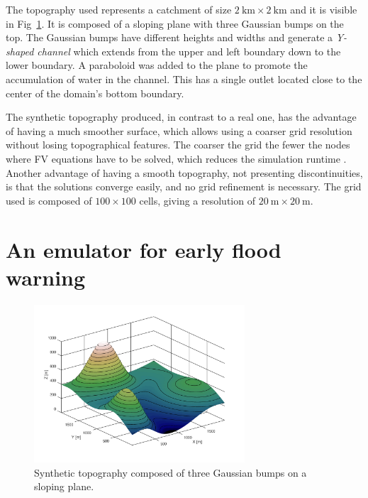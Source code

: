 The topography used represents a catchment of size $\SI{2}{\kilo\meter} \times \SI{2}{\kilo\meter}$ and it is visible in Fig~\ref{fig:topography}.
It is composed of a sloping plane with three Gaussian bumps on the top.
The Gaussian bumps have different heights and widths and generate a \emph{Y-shaped channel} which extends from the upper and left boundary down to the lower boundary.
A paraboloid was added to the plane to promote the accumulation of water in the channel.
This has a single outlet located close to the center of the domain's bottom boundary.

The synthetic topography produced, in contrast to a real one, has the advantage of having a much smoother surface, which allows using a coarser grid resolution without losing topographical features.
The coarser the grid the fewer the nodes where FV equations have to be solved, which reduces the simulation runtime . 
Another advantage of having a smooth topography, not presenting discontinuities, is that the solutions converge easily, and no grid refinement is necessary.
The grid used is composed of $\num{100} \times \num{100}$ cells, giving a resolution of $\SI{20}{\meter} \times \SI{20}{\meter}.$

\section{An emulator for early flood warning}

\begin{figure}[htpb]
  \centering
  \includegraphics[width=0.7\textwidth]{Figures/topography.png}
  \caption{Synthetic topography composed of three Gaussian bumps on a sloping plane.}
  \label{fig:topography}
\end{figure}


